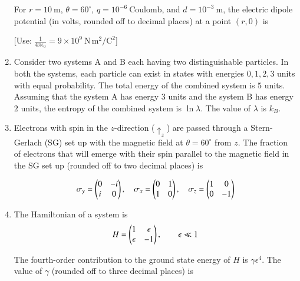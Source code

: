 \documentclass[journal,12pt,onecolumn]{IEEEtran}
\begin{document}
\begin{enumerate}[itemsep=0.45cm]
    For $r = 10\ \mathrm{m}$, $\theta = 60^\circ$, $q = 10^{-6}\ \mathrm{Coulomb}$, and $d = 10^{-3}\ \mathrm{m}$, the electric dipole potential (in volts, rounded off to decimal places) at a point $(r,0)$ is  

  [Use: $\tfrac{1}{4\pi\epsilon_{0}} = 9 \times 10^9\ \mathrm{N\,m^2/C^2}$]

  \hfill{}
  

  \item Consider two systems A and B each having two distinguishable particles. In both the systems, each particle can exist in states with energies $0,1,2,3$ units with equal probability. The total energy of the combined system is $5$ units. Assuming that the system A has energy $3$ units and the system B has energy $2$ units, the entropy of the combined system is $\ln \lambda$. The value of $\lambda$ is $k_B$.

  \hfill{}

  \item Electrons with spin in the $z$-direction ($\uparrow_z$) are passed through a Stern-Gerlach (SG) set up with the magnetic field at $\theta = 60^\circ$ from $z$. The fraction of electrons that will emerge with their spin parallel to the magnetic field in the SG set up (rounded off to two decimal places) is  

    \begin{align*}
     \sigma_{y} = \begin{pmatrix}0 & -i \\i & 0\end{pmatrix}
    ,\quad
    \sigma_{x} =  \begin{pmatrix} 0 & 1 \\  1 & 0\end{pmatrix}
    ,\quad
    \sigma_{z} = \begin{pmatrix} 1 & 0 \\ 0 & -1\end{pmatrix}
    \end{align*}
  
  

  \hfill{}

  \item The Hamiltonian of a system is 
  \begin{align*}
   H = \begin{pmatrix} 1 & \epsilon \\ \epsilon & -1\end{pmatrix}
    , \qquad \epsilon \ll 1
  \end{align*}
  
  The fourth-order contribution to the ground state energy of $H$ is $\gamma \epsilon^4$. The value of $\gamma$ (rounded off to three decimal places) is

  \hfill{}

  \newpage


\end{enumerate}
\end{document}
